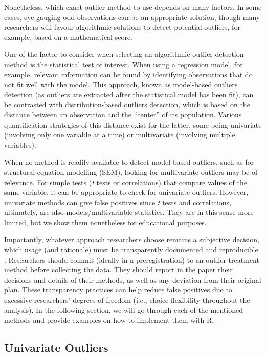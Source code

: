 \documentclass[mathematics,article,submit,moreauthors,pdftex]{mdpi}
\begin{document}
Nonetheless, which exact outlier method to use depends on many factors.
In some cases, eye-gauging odd observations can be an appropriate
solution, though many researchers will favour algorithmic solutions to
detect potential outliers, for example, based on a mathematical score.

One of the factor to consider when selecting an algorithmic outlier
detection method is the statistical test of interest. When using a
regression model, for example, relevant information can be found by
identifying observations that do not fit well with the model. This
approach, known as model-based outliers detection (as outliers are
extracted after the statistical model has been fit), can be contrasted
with distribution-based outliers detection, which is based on the
distance between an observation and the ``center'' of its population.
Various quantification strategies of this distance exist for the latter,
some being univariate (involving only one variable at a time) or
multivariate (involving multiple variables).

When no method is readily available to detect model-based outliers, such
as for structural equation modelling (SEM), looking for multivariate
outliers may be of relevance. For simple tests (\emph{t} tests or
correlations) that compare values of the same variable, it can be
appropriate to check for univariate outliers. However, univariate
methods can give false positives since \emph{t} tests and correlations,
ultimately, are also models/multivariable statistics. They are in this
sense more limited, but we show them nonetheless for educational
purposes.

Importantly, whatever approach researchers choose remains a subjective
decision, which usage (and rationale) must be transparently documented
and reproducible \citep{leys2019outliers}. Researchers should commit
(ideally in a preregistration) to an outlier treatment method before
collecting the data. They should report in the paper their decisions and
details of their methods, as well as any deviation from their original
plan. These transparency practices can help reduce false positives due
to excessive researchers' degrees of freedom (i.e., choice flexibility
throughout the analysis). In the following section, we will go through
each of the mentioned methods and provide examples on how to implement
them with R.

\hypertarget{univariate-outliers}{%
\subsection{Univariate Outliers}\label{univariate-outliers}}
\end{document}
